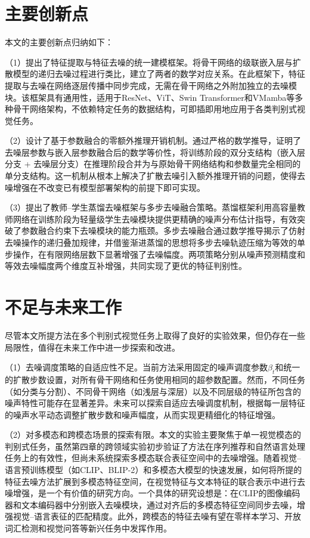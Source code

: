 \section{主要创新点}

本文的主要创新点归纳如下：

（1）提出了特征提取与特征去噪的统一建模框架。将骨干网络的级联嵌入层与扩散模型的递归去噪过程进行类比，建立了两者的数学对应关系。在此框架下，特征提取与去噪在网络逐层传播中同步完成，无需在骨干网络之外附加独立的去噪模块。该框架具有通用性，适用于ResNet、ViT、Swin Transformer和VMamba等多种骨干网络架构，不依赖特定任务的数据结构，可即插即用地应用于各类判别式视觉任务。

（2）设计了基于参数融合的零额外推理开销机制。通过严格的数学推导，证明了去噪层参数与嵌入层参数融合后的数学等价性，将训练阶段的双分支结构（嵌入层分支 + 去噪层分支）在推理阶段合并为与原始骨干网络结构和参数量完全相同的单分支结构。这一机制从根本上解决了扩散去噪引入额外推理开销的问题，使得去噪增强在不改变已有模型部署架构的前提下即可实现。

（3）提出了教师--学生蒸馏去噪框架与多步去噪融合策略。蒸馏框架利用高容量教师网络在训练阶段为轻量级学生去噪模块提供更精确的噪声分布估计指导，有效突破了参数融合约束下去噪模块的能力瓶颈。多步去噪融合通过数学推导揭示了仿射去噪操作的递归叠加规律，并借鉴渐进蒸馏的思想将多步去噪轨迹压缩为等效的单步操作，在有限网络层数下显著增强了去噪幅度。两项策略分别从噪声预测精度和等效去噪幅度两个维度互补增强，共同实现了更优的特征判别性。

\section{不足与未来工作}

尽管本文所提方法在多个判别式视觉任务上取得了良好的实验效果，但仍存在一些局限性，值得在未来工作中进一步探索和改进。

（1）去噪调度策略的自适应性不足。当前方法采用固定的噪声调度参数$\beta_t$和统一的扩散步数设置，对所有骨干网络和任务使用相同的超参数配置。然而，不同任务（如分类与分割）、不同骨干网络（如浅层与深层）以及不同层级的特征所包含的噪声特性可能存在显著差异。未来可以探索自适应去噪调度机制，根据每一层特征的噪声水平动态调整扩散步数和噪声幅度，从而实现更精细化的特征增强。

（2）对多模态和跨模态场景的探索有限。本文的实验主要聚焦于单一视觉模态的判别式任务，虽然第四章的跨领域实验初步验证了方法在序列推荐和自然语言处理任务上的有效性，但尚未系统探索多模态联合表征空间中的去噪增强。随着视觉--语言预训练模型（如CLIP\cite{radford2021learning}、BLIP-2\cite{li2023blip}）和多模态大模型的快速发展，如何将所提的特征去噪方法扩展到多模态特征空间，在视觉特征与文本特征的联合表示中进行去噪增强，是一个有价值的研究方向。一个具体的研究设想是：在CLIP的图像编码器和文本编码器中分别嵌入去噪模块，通过对齐后的多模态特征空间同步去噪，增强视觉--语言表征的匹配精度。此外，跨模态的特征去噪有望在零样本学习、开放词汇检测和视觉问答等新兴任务中发挥作用。

